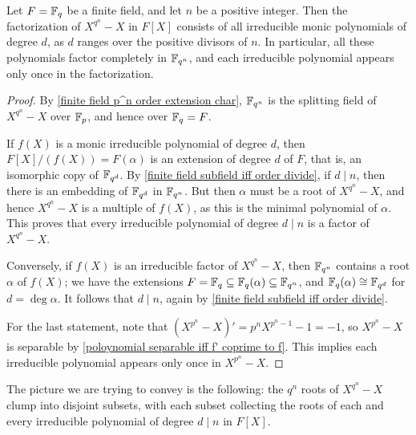 \begin{corollary}
Let $F=\mathbb{F}_q$ be a finite field, and let $n$ be a positive integer. Then the factorization of $X^{q^n}-X$ in $F[X]$ consists of all irreducible monic polynomials of degree $d$, as $d$ ranges over the positive divisors of $n$. In particular, all these polynomials factor completely in $\mathbb{F}_{q^n}$, and each irreducible polynomial appears only once in the factorization.
\end{corollary}
\begin{proof}
By \cref{finite field p^n order extension char}, $\mathbb{F}_{q^n}$ is the splitting field of $X^{q^n}-X$ over $\mathbb{F}_p$, and hence over $\mathbb{F}_q=F$.\par
If $f(X)$ is a monic irreducible polynomial of degree $d$, then $F[X]/(f(X))=F(\alpha)$ is an extension of degree $d$ of $F$, that is, an isomorphic copy of $\mathbb{F}_{q^d}$. By \cref{finite field subfield iff order divide}, if $d\mid n$, then there is an embedding of $\mathbb{F}_{q^d}$ in $\mathbb{F}_{q^n}$. But then $\alpha$ must be a root of $X^{q^n}-X$, and hence $X^{q^n}-X$ is a multiple of $f(X)$, as this is the minimal polynomial of $\alpha$. This proves that every irreducible polynomial of degree $d\mid n$ is a factor of $X^{q^n}-X$.\par
Conversely, if $f(X)$ is an irreducible factor of $X^{q^n}-X$, then $\mathbb{F}_{q^n}$ contains a root $\alpha$ of $f(X)$; we have the extensions $F=\mathbb{F}_q\subseteq\mathbb{F}_q(\alpha)\subseteq\mathbb{F}_{q^n}$, and $\mathbb{F}_q(\alpha)\cong\mathbb{F}_{q^d}$ for $d=\deg\alpha$. It follows that $d\mid n$, again by \cref{finite field subfield iff order divide}.\par
For the last statement, note that $(X^{p^n}-X)'=p^nX^{p^n-1}-1=-1$, so $X^{p^n}-X$ is separable by \cref{poloynomial separable iff f' coprime to f}. This implies each irreducible polynomial appears only once in $X^{p^n}-X$.
\end{proof}
The picture we are trying to convey is the following: the $q^n$ roots of $X^{q^n}-X$ clump into disjoint subsets, with each subset collecting the roots of each and every irreducible polynomial of degree $d\mid n$ in $F[X]$.
